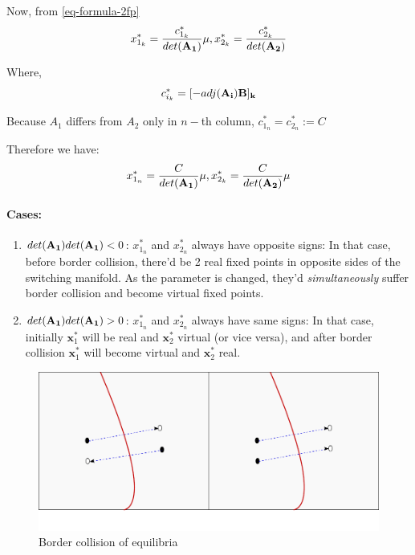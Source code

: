 \documentclass{book}
\renewcommand{\(}{\begin{columns}}
\renewcommand{\)}{\end{columns}}
\newcommand{\<}[1]{\begin{column}{#1}}
\renewcommand{\>}{\end{column}}
\newcommand{\mb}[1]{\mathbf{#1}}
\newcommand{\para}{\paragraph}
\begin{document}
Now, from \eqref{eq-formula-2fp}
\begin{equation}
\label{eq-formula2-2fp}
x^*_{1_k}=\frac{c^*_{1_k}}{det(\bf{A_1})}\mu, x^*_{2_k}=\frac{c^*_{2_k}}{det(\bf{A_2})}
\end{equation}

Where, \[
c^*_{i_k}=[-adj(\bf{A_i)B}]_k
\]

Because $A_1$ differs from $A_2$ only in $n-$th column, $c^*_{1_n}=c^*_{2_n}:=C$

Therefore we have:
\begin{equation}
\label{eq-final-form-2fps}
x^*_{1_n}=\frac{C}{det(\bf{A_1})}\mu, x^*_{2_k}=\frac{C}{det(\bf{A_2})}\mu
\end{equation}

\para{Cases:\\}
\begin{enumerate}
\item $det({\bf A_1})det({\bf A_1})<0$:  $x^*_{1_n}$ and $x^*_{2_n}$ always have 
opposite signs:  In that case, before border collision, there'd be 2 real 
fixed points in opposite sides of the switching manifold. As the parameter is 
changed, they'd \emph{simultaneously} suffer border collision and become 
virtual fixed points.  
\item $det({\bf A_1})det({\bf A_1})>0$:  $x^*_{1_n}$ and $x^*_{2_n}$ always have 
same signs: In that case, initially $\mb{x}_1^*$ will be real and $\mb{x}_2^*$ 
virtual (or vice versa), and after border collision $\mb{x}_1^*$ will become virtual and $\mb{x}_2^*$ 
real.  
\end{enumerate}

\begin{figure}
\caption{Border collision of equilibria}
\begin{center}
\includegraphics[width=0.9\columnwidth]{cases}
\end{center}
\end{figure}
\end{document}
